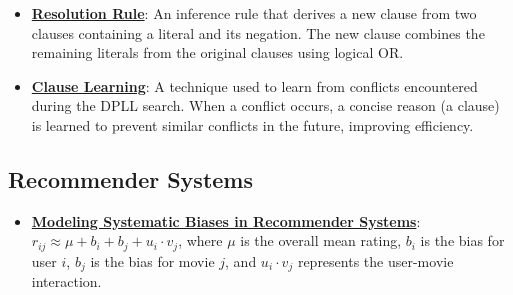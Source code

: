 \documentclass{article}%
\begin{document}
\begin{itemize}[leftmargin=*]
\item \href{https://purdue.brightspace.com/d2l/common/assets/pdfjs-d2l-dist/1.0.14-legacy/web/viewer.html?file=\%2Fcontent\%2Fenforced\%2F1095467-wl.202510.CS.24300.001\%2F15L2-SAT.pdf\%3Fou\%3D1095467\&lang=en-us\&container=d2l-fileviewer-rendered-pdf\&fullscreen=d2l-fileviewer-rendered-pdf-dialog\&height=667#page=32}{\textbf{Resolution Rule}}: An inference rule that derives a new clause from two clauses containing a literal and its negation. The new clause combines the remaining literals from the original clauses using logical OR.%
\item \href{https://purdue.brightspace.com/d2l/common/assets/pdfjs-d2l-dist/1.0.14-legacy/web/viewer.html?file=\%2Fcontent\%2Fenforced\%2F1095467-wl.202510.CS.24300.001\%2F15L2-SAT.pdf\%3Fou\%3D1095467\&lang=en-us\&container=d2l-fileviewer-rendered-pdf\&fullscreen=d2l-fileviewer-rendered-pdf-dialog\&height=667#page=35}{\textbf{Clause Learning}}: A technique used to learn from conflicts encountered during the DPLL search. When a conflict occurs, a concise reason (a clause) is learned to prevent similar conflicts in the future, improving efficiency.%
\end{itemize}

%
\subsection{Recommender Systems}%
\label{subsec:RecommenderSystems}%
\begin{itemize}[leftmargin=*]%
\item \href{https://purdue.brightspace.com/d2l/common/assets/pdfjs-d2l-dist/1.0.14-legacy/web/viewer.html?file=\%2Fcontent\%2Fenforced\%2F1095467-wl.202510.CS.24300.001\%2F11L2-svd-pca-recommender.pdf\%3Fou\%3D1095467\&lang=en-us\&container=d2l-fileviewer-rendered-pdf\&fullscreen=d2l-fileviewer-rendered-pdf-dialog\&height=667#page=44}{\textbf{Modeling Systematic Biases in Recommender Systems}}: $r_{ij} \approx \mu + b_i + b_j + u_i \cdot v_j$, where $\mu$ is the overall mean rating, $b_i$ is the bias for user $i$, $b_j$ is the bias for movie $j$, and $u_i \cdot v_j$ represents the user-movie interaction.%
\end{itemize}

%
\end{document}
